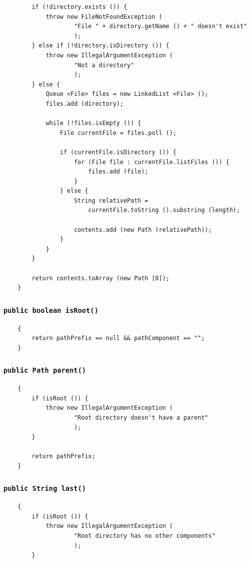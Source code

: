 \documentclass [10pt, a4paper]{article}
\begin{document}
\begin {verbatim}
        if (!directory.exists ()) {
            throw new FileNotFoundException (
                    "File " + directory.getName () + " doesn't exist"
                    );
        } else if (!directory.isDirectory ()) {
            throw new IllegalArgumentException (
                    "Not a directory"
                    );
        } else {
            Queue <File> files = new LinkedList <File> ();
            files.add (directory);

            while (!files.isEmpty ()) {
                File currentFile = files.poll ();

                if (currentFile.isDirectory ()) {
                    for (File file : currentFile.listFiles ()) {
                        files.add (file);
                    }
                } else {
                    String relativePath =
                        currentFile.toString ().substring (length);

                    contents.add (new Path (relativePath));
                }
            }
        }

        return contents.toArray (new Path [0]);
    }
\end {verbatim}

\subsubsection{\texttt{public boolean isRoot()}}
\begin {verbatim}
    {
        return pathPrefix == null && pathComponent == "";
    }
\end {verbatim}

\subsubsection{\texttt{public Path parent()}}
\begin {verbatim}
    {
        if (isRoot ()) {
            throw new IllegalArgumentException (
                    "Root directory doesn't have a parent"
                    );
        }

        return pathPrefix;
    }
\end {verbatim}

\subsubsection{\texttt{public String last()}}
\begin {verbatim}
    {
        if (isRoot ()) {
            throw new IllegalArgumentException (
                    "Root directory has no other components"
                    );
        }


\end{verbatim}
\end{document}
